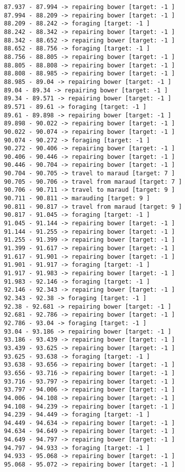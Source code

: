 \documentclass[11pt]{article}
\begin{document}
\begin{Verbatim}[commandchars=\\\{\}]
87.937 - 87.994 -> repairing bower [target: -1 ]
87.994 - 88.209 -> repairing bower [target: -1 ]
88.209 - 88.242 -> foraging [target: -1 ]
88.242 - 88.342 -> repairing bower [target: -1 ]
88.342 - 88.652 -> repairing bower [target: -1 ]
88.652 - 88.756 -> foraging [target: -1 ]
88.756 - 88.805 -> repairing bower [target: -1 ]
88.805 - 88.808 -> repairing bower [target: -1 ]
88.808 - 88.985 -> repairing bower [target: -1 ]
88.985 - 89.04 -> repairing bower [target: -1 ]
89.04 - 89.34 -> repairing bower [target: -1 ]
89.34 - 89.571 -> repairing bower [target: -1 ]
89.571 - 89.61 -> foraging [target: -1 ]
89.61 - 89.898 -> repairing bower [target: -1 ]
89.898 - 90.022 -> repairing bower [target: -1 ]
90.022 - 90.074 -> repairing bower [target: -1 ]
90.074 - 90.272 -> foraging [target: -1 ]
90.272 - 90.406 -> repairing bower [target: -1 ]
90.406 - 90.446 -> repairing bower [target: -1 ]
90.446 - 90.704 -> repairing bower [target: -1 ]
90.704 - 90.705 -> travel to maraud [target: 7 ]
90.705 - 90.706 -> travel from maraud [target: 7 ]
90.706 - 90.711 -> travel to maraud [target: 9 ]
90.711 - 90.811 -> marauding [target: 9 ]
90.811 - 90.817 -> travel from maraud [target: 9 ]
90.817 - 91.045 -> foraging [target: -1 ]
91.045 - 91.144 -> repairing bower [target: -1 ]
91.144 - 91.255 -> repairing bower [target: -1 ]
91.255 - 91.399 -> repairing bower [target: -1 ]
91.399 - 91.617 -> repairing bower [target: -1 ]
91.617 - 91.901 -> repairing bower [target: -1 ]
91.901 - 91.917 -> foraging [target: -1 ]
91.917 - 91.983 -> repairing bower [target: -1 ]
91.983 - 92.146 -> foraging [target: -1 ]
92.146 - 92.343 -> repairing bower [target: -1 ]
92.343 - 92.38 -> foraging [target: -1 ]
92.38 - 92.681 -> repairing bower [target: -1 ]
92.681 - 92.786 -> repairing bower [target: -1 ]
92.786 - 93.04 -> foraging [target: -1 ]
93.04 - 93.186 -> repairing bower [target: -1 ]
93.186 - 93.439 -> repairing bower [target: -1 ]
93.439 - 93.625 -> repairing bower [target: -1 ]
93.625 - 93.638 -> foraging [target: -1 ]
93.638 - 93.656 -> repairing bower [target: -1 ]
93.656 - 93.716 -> repairing bower [target: -1 ]
93.716 - 93.797 -> repairing bower [target: -1 ]
93.797 - 94.006 -> repairing bower [target: -1 ]
94.006 - 94.108 -> repairing bower [target: -1 ]
94.108 - 94.239 -> repairing bower [target: -1 ]
94.239 - 94.449 -> foraging [target: -1 ]
94.449 - 94.634 -> repairing bower [target: -1 ]
94.634 - 94.649 -> repairing bower [target: -1 ]
94.649 - 94.797 -> repairing bower [target: -1 ]
94.797 - 94.933 -> foraging [target: -1 ]
94.933 - 95.068 -> repairing bower [target: -1 ]
95.068 - 95.072 -> repairing bower [target: -1 ]

\end{Verbatim}
\end{document}
